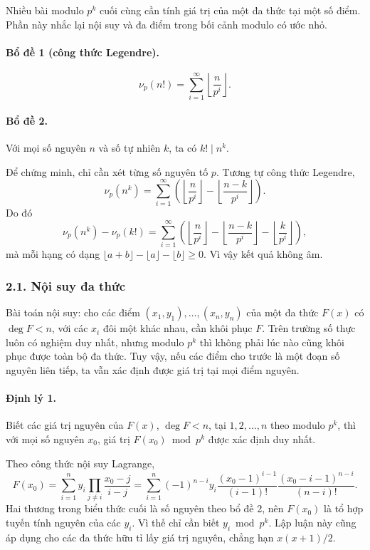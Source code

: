 \documentclass[11pt]{article}
\begin{document}
Nhiều bài modulo \(p^k\) cuối cùng cần tính giá trị của một đa thức tại một số
điểm. Phần này nhắc lại nội suy và đa điểm trong bối cảnh modulo có ước nhỏ.

\paragraph{Bổ đề 1 (công thức Legendre).}
\[
  \nu_p(n!)=\sum_{i=1}^{\infty}\left\lfloor\frac n{p^i}\right\rfloor .
\]

\paragraph{Bổ đề 2.}
Với mọi số nguyên \(n\) và số tự nhiên \(k\), ta có \(k!\mid n^k\).

Để chứng minh, chỉ cần xét từng số nguyên tố \(p\). Tương tự công thức
Legendre,
\[
  \nu_p(n^k)=\sum_{i=1}^{\infty}
  \left(\left\lfloor\frac n{p^i}\right\rfloor
  -\left\lfloor\frac {n-k}{p^i}\right\rfloor\right).
\]
Do đó
\[
  \nu_p(n^k)-\nu_p(k!)=
  \sum_{i=1}^{\infty}
  \left(
  \left\lfloor\frac n{p^i}\right\rfloor
  -\left\lfloor\frac {n-k}{p^i}\right\rfloor
  -\left\lfloor\frac k{p^i}\right\rfloor
  \right),
\]
mà mỗi hạng có dạng \(\lfloor a+b\rfloor-\lfloor a\rfloor-\lfloor b\rfloor\ge
0\). Vì vậy kết quả không âm.

\subsubsection*{2.1. Nội suy đa thức}

Bài toán nội suy: cho các điểm \((x_1,y_1),\ldots,(x_n,y_n)\) của một đa thức
\(F(x)\) có \(\deg F<n\), với các \(x_i\) đôi một khác nhau, cần khôi phục
\(F\). Trên trường số thực luôn có nghiệm duy nhất, nhưng modulo \(p^k\) thì
không phải lúc nào cũng khôi phục được toàn bộ đa thức. Tuy vậy, nếu các điểm
cho trước là một đoạn số nguyên liên tiếp, ta vẫn xác định được giá trị tại mọi
điểm nguyên.

\paragraph{Định lý 1.}
Biết các giá trị nguyên của \(F(x)\), \(\deg F<n\), tại \(1,2,\ldots,n\) theo
modulo \(p^k\), thì với mọi số nguyên \(x_0\), giá trị \(F(x_0)\bmod p^k\) được
xác định duy nhất.

Theo công thức nội suy Lagrange,
\[
  F(x_0)=\sum_{i=1}^n y_i\prod_{j\ne i}\frac{x_0-j}{i-j}
  =\sum_{i=1}^n(-1)^{n-i}y_i
  \frac{(x_0-1)^{i-1}}{(i-1)!}
  \frac{(x_0-i-1)^{n-i}}{(n-i)!}.
\]
Hai thương trong biểu thức cuối là số nguyên theo bổ đề 2, nên \(F(x_0)\) là
tổ hợp tuyến tính nguyên của các \(y_i\). Vì thế chỉ cần biết \(y_i\bmod p^k\).
Lập luận này cũng áp dụng cho các đa thức hữu tỉ lấy giá trị nguyên, chẳng hạn
\(x(x+1)/2\).
\end{document}
